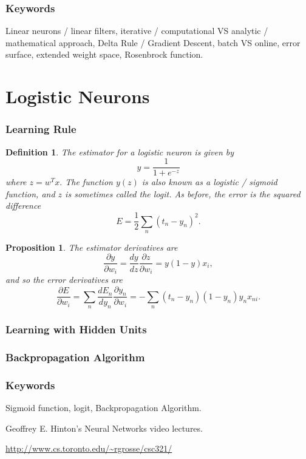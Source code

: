 \documentclass[12pt]{article}
\theoremstyle{plain}
\newtheorem{proposition}[theorem]{Proposition}
\newtheorem{definition}[theorem]{Definition}
\theoremstyle{definition}
\theoremstyle{remark}
\begin{document}
\section{Keywords}

Linear neurons / linear filters, iterative / computational VS analytic / mathematical approach, Delta Rule / Gradient Descent, batch VS online, error surface, extended weight space, Rosenbrock function.

\part{Logistic Neurons}

\section{Learning Rule}

\begin{definition}
The estimator for a logistic neuron is given by
$$y = \frac{1}{1 + e^{-z}}$$ where $z = w^T x.$ The function $y(z)$ is also known as a logistic / sigmoid function, and $z$ is sometimes called the logit. As before, the error is the squared difference
$$E = \frac{1}{2} \sum_n (t_n - y_n)^2.$$
\end{definition}

\begin{proposition}
The estimator derivatives are
$$\frac{\partial y}{\partial w_i} = \frac{dy}{dz} \frac{\partial z}{\partial w_i} 
= y(1 - y) x_i,$$ and so the error derivatives are
$$\frac{\partial E}{\partial w_i} = \sum_n \frac{dE_n}{dy_n} \frac{\partial y_n}{\partial w_i} = - \sum_n (t_n - y_n)(1 - y_n) y_n x_{ni}.$$
\end{proposition}

\section{Learning with Hidden Units}



\section{Backpropagation Algorithm}



\section{Keywords}

Sigmoid function, logit, Backpropagation Algorithm.

\begin{thebibliography}{99}

Geoffrey E. Hinton's Neural Networks video lectures.

\url{http://www.cs.toronto.edu/~rgrosse/csc321/}

\end{thebibliography}
\end{document}
